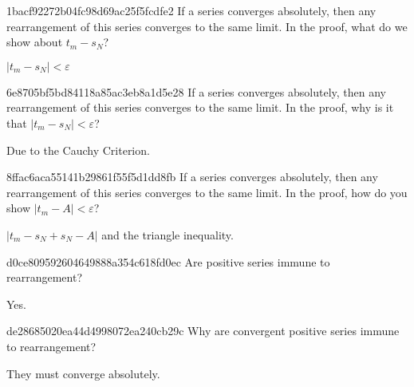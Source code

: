 \begin{note}{1bacf92272b04fc98d69ac25f5fcdfe2}
    If a series converges absolutely, then any rearrangement of this series converges to the same limit.
    In the proof, what do we show about \({ t_m - s_N }\)?

    \begin{cloze}{1}
        \({ \left\lvert t_m - s_N \right\rvert < \varepsilon }\)
    \end{cloze}
\end{note}

\begin{note}{6e8705bf5bd84118a85ac3eb8a1d5e28}
    If a series converges absolutely, then any rearrangement of this series converges to the same limit.
    In the proof, why is it that \({ \left\lvert t_m - s_N \right\rvert < \varepsilon }\)?

    \begin{cloze}{1}
        Due to the Cauchy Criterion.
    \end{cloze}
\end{note}

\begin{note}{8ffac6aca55141b29861f55f5d1dd8fb}
    If a series converges absolutely, then any rearrangement of this series converges to the same limit.
    In the proof, how do you show \({ \left\lvert t_m - A \right\rvert < \varepsilon }\)?

    \begin{cloze}{1}
        \({ \left\lvert t_m - s_N + s_N - A \right\rvert }\) and the triangle inequality.
    \end{cloze}
\end{note}

\begin{note}{d0ce809592604649888a354c618fd0ec}
    Are positive series immune to rearrangement?

    \begin{cloze}{1}
        Yes.
    \end{cloze}
\end{note}

\begin{note}{de28685020ea44d4998072ea240cb29c}
    Why are convergent positive series immune to rearrangement?

    \begin{cloze}{1}
        They must converge absolutely.
    \end{cloze}
\end{note}

